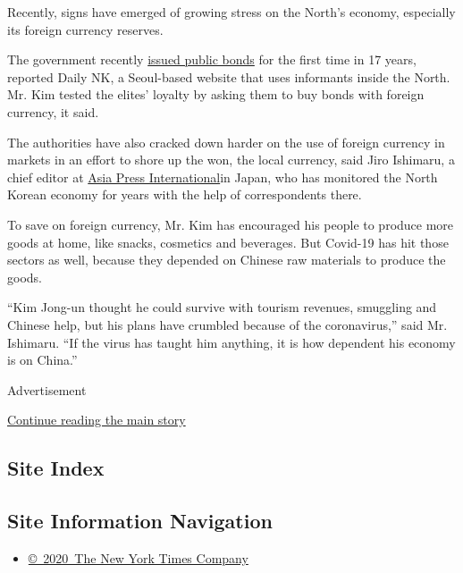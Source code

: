 ​Recently, signs have emerged of growing stress on the North's economy,
especially its foreign currency reserves.

The government recently
\href{https://www.dailynk.com/english/north-korea-begun-issuing-public-bonds/}{issued
public bonds} for the first time in 17 years, reported Daily NK, a
Seoul-based website that uses informants inside ​the ​North. Mr. Kim
tested the elites' loyalty by asking them to buy bonds with foreign
currency, it said.

The authorities have also cracked down harder on the use of foreign
currency in markets in an effort to shore up the won, the local
currency, said Jiro Ishimaru, a chief editor at
\href{http://www.asiapress.org/rimjin-gang/}{Asia Press International}in
Japan, who has monitored the North Korean economy for years with the
help of correspondents there.

To save on foreign currency, ​Mr. Kim has encouraged his people to
produce more goods at home, like snacks, cosmetics and beverages. But
Covid-19 has hit those sectors as well, because they depended on Chinese
raw materials to produce the goods.

``Kim Jong-un thought he could survive with tourism revenues, smuggling
and Chinese help,​ but his plans have crumbled because of the
coronavirus,'' said Mr. Ishimaru​. ``If the virus has taught him
anything, it is how dependent his economy is on China.''

Advertisement

\protect\hyperlink{after-bottom}{Continue reading the main story}

\hypertarget{site-index}{%
\subsection{Site Index}\label{site-index}}

\hypertarget{site-information-navigation}{%
\subsection{Site Information
Navigation}\label{site-information-navigation}}

\begin{itemize}
\tightlist
\item
  \href{https://help.nytimes3xbfgragh.onion/hc/en-us/articles/115014792127-Copyright-notice}{©~2020~The
  New York Times Company}
\end{itemize}

